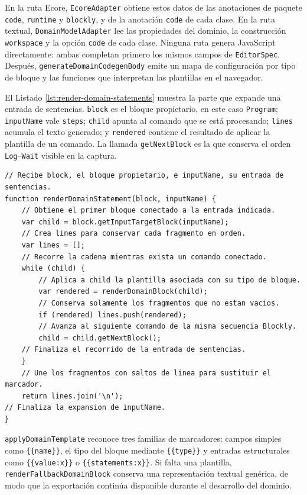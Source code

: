 En la ruta Ecore, \texttt{EcoreAdapter} obtiene estos datos de las anotaciones
de paquete \texttt{code}, \texttt{runtime} y \texttt{blockly}, y de la
anotación \texttt{code} de cada clase. En la ruta textual,
\texttt{DomainModelAdapter} lee las propiedades del dominio, la construcción
\texttt{workspace} y la opción \texttt{code} de cada clase. Ninguna ruta
genera JavaScript directamente: ambas completan primero los mismos campos de
\texttt{EditorSpec}. Después, \texttt{generateDomainCodegenBody} emite un mapa
de configuración por tipo de bloque y las funciones que interpretan las
plantillas en el navegador.

El Listado \ref{lst:render-domain-statements} muestra la parte que expande una
entrada de sentencias. \texttt{block} es el bloque propietario, en este caso
\texttt{Program}; \texttt{inputName} vale \texttt{steps}; \texttt{child}
apunta al comando que se está procesando; \texttt{lines} acumula el texto
generado; y \texttt{rendered} contiene el resultado de aplicar la plantilla de
un comando. La llamada \texttt{getNextBlock} es la que conserva el orden
\texttt{Log}--\texttt{Wait} visible en la captura.

\begin{lstlisting}[float=htbp, style=tfmjavascript, captionpos=t, caption={Expansión comentada de una secuencia de sentencias}, label={lst:render-domain-statements}]
// Recibe block, el bloque propietario, e inputName, su entrada de sentencias.
function renderDomainStatement(block, inputName) {
    // Obtiene el primer bloque conectado a la entrada indicada.
    var child = block.getInputTargetBlock(inputName);
    // Crea lines para conservar cada fragmento en orden.
    var lines = [];
    // Recorre la cadena mientras exista un comando conectado.
    while (child) {
        // Aplica a child la plantilla asociada con su tipo de bloque.
        var rendered = renderDomainBlock(child);
        // Conserva solamente los fragmentos que no estan vacios.
        if (rendered) lines.push(rendered);
        // Avanza al siguiente comando de la misma secuencia Blockly.
        child = child.getNextBlock();
    // Finaliza el recorrido de la entrada de sentencias.
    }
    // Une los fragmentos con saltos de linea para sustituir el marcador.
    return lines.join('\n');
// Finaliza la expansion de inputName.
}
\end{lstlisting}

\texttt{applyDomainTemplate} reconoce tres familias de marcadores: campos
simples como \texttt{\{\{name\}\}}, el tipo del bloque mediante
\texttt{\{\{type\}\}} y entradas estructurales como
\texttt{\{\{value:x\}\}} o \texttt{\{\{statements:x\}\}}. Si falta una
plantilla, \texttt{renderFallbackDomainBlock} conserva una representación
textual genérica, de modo que la exportación continúa disponible durante el
desarrollo del dominio.

